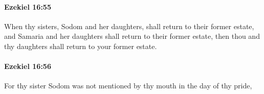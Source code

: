		\paragraph{Ezekiel 16:55} %
			\label{EZEKIEL-16-55}

			When thy sisters, Sodom and her daughters, shall return to their former estate, and Samaria and her daughters shall return to their former estate, then thou and thy daughters shall return to your former estate.


		\paragraph{Ezekiel 16:56} %
			\label{EZEKIEL-16-56}

			For thy sister Sodom was not mentioned by thy mouth in the day of thy pride,


